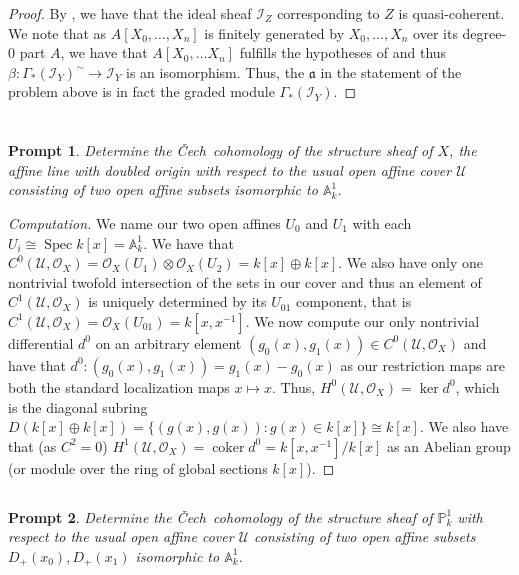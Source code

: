 \documentclass[english,letter,doublesided]{article}
\DeclareMathOperator{\spec}{Spec}
\renewcommand{\AA}{\mathbb{A}}
\newcommand{\OO}{\mathcal{O}}
\newcommand{\PP}{\mathbb{P}}
\newcommand{\afr}{\mathfrak{a}}
\newcommand{\Ical}{\mathcal{I}}
\newcommand{\prob}[1]{\setcounter{section}{#1-1}\section{}}
\newcommand{\prt}[1]{\setcounter{subsection}{#1-1}\subsection{}}
\newtheorem*{prompt*}{Prompt}
\theoremstyle{remark}
\theoremstyle{definition}
\DeclareMathOperator{\coker}{coker}
\newcommand{\cech}{\v Cech~}
\newcommand{\ucal}{{ \mathcal{U}}}
\begin{document}
\begin{proof}
	By \cite[II.5.9]{HSAG}, we have that the ideal sheaf $\Ical_Z$ corresponding to $Z$ is quasi-coherent. We note that as $A[X_0,\dots,X_n]$ is finitely generated by $X_0,\dots,X_n$ over its degree-0 part $A$, we have that $A[X_0,\dots X_n]$ fulfills the hypotheses of \cite[II.5.15]{HSAG} and thus $\beta:\Gamma_*(\Ical_Y)^\sim \to \Ical_Y$ is an isomorphism. Thus, the $\afr$ in the statement of the problem above is in fact the graded module $\Gamma_*(\Ical_Y)$.
\end{proof}
	\prob{5}
\prt{1} \begin{prompt*}
Determine the \cech cohomology of the structure sheaf of $X$, the affine line with doubled origin with respect to the usual open affine cover $\ucal$ consisting of two open affine subsets isomorphic to $\AA^1_k$.
\end{prompt*}
\begin{proof}[Computation]
We name our two open affines $U_0$ and $U_1$ with each $U_i\cong \spec k[x]=\AA^1_k$. We have that $C^0(\ucal,\OO_X)=\OO_X(U_1)\otimes \OO_X(U_2)=k[x]\oplus k[x]$. We also have only one nontrivial twofold intersection of the sets in our cover and thus an element of $C^1(\ucal,\OO_X)$ is uniquely determined by its $U_{01}$ component, that is $C^1(\ucal,\OO_X)=\OO_X(U_{01})=k[x,x^{-1}]$. We now compute our only nontrivial differential $d^0$ on an arbitrary element $(g_0(x),g_1(x))\in C^0(\ucal,\OO_X)$ and have that $d^0:(g_0(x),g_1(x))=g_1(x)-g_0(x)$ as our restriction maps are both the standard localization maps $x\mapsto x$. Thus, $H^0(\ucal,\OO_X)=\ker d^0$, which is the diagonal subring $D(k[x]\oplus k[x])=\{(g(x),g(x)): g(x)\in k[x]\}\cong k[x]$. We also have that (as $C^2=0$) $H^1(\ucal, \OO_X)=\coker d^0=k[x,x^{-1}]/k[x]$ as an Abelian group (or module over the ring of global sections $k[x]$). \end{proof}
\prt{2}
\begin{prompt*}
	Determine the \cech cohomology of the structure sheaf of $\PP^1_k$ with respect to the usual open affine cover $\ucal$ consisting of two open affine subsets $D_+(x_0),D_+(x_1)$ isomorphic to $\AA^1_k$.
\end{prompt*}
\end{document}

